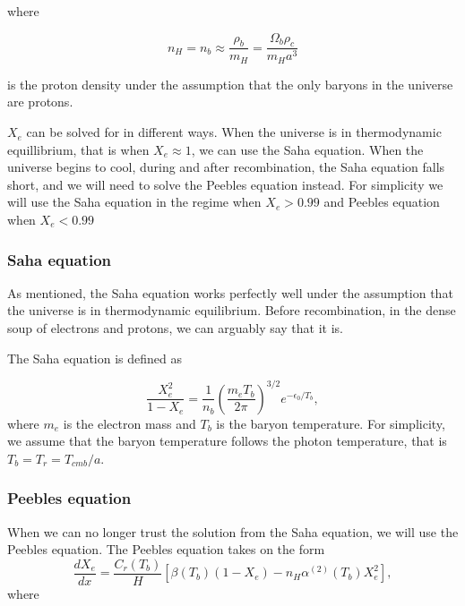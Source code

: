 \documentclass[12pt]{article}
\begin{document}
where 

\begin{equation}\label{eq: proton density}
    n_{H}=n_{b} \approx \frac{\rho_{b}}{m_{H}}=\frac{\Omega_{b} \rho_{c}}{m_{H} a^{3}}
\end{equation}

is the proton density under the assumption that the only baryons in the universe are protons. 

$X_e$ can be solved for in different ways. When the universe is in thermodynamic equillibrium, that is when $X_e \approx 1$, we can use the Saha equation. When the universe begins to cool, during and after recombination, the Saha equation falls short, and we will need to solve the Peebles equation instead. For simplicity we will use the Saha equation in the regime when $X_e > 0.99$ and Peebles equation when $X_e < 0.99$

\subsubsection{Saha equation}
As mentioned, the Saha equation works perfectly well under the assumption that the universe is in thermodynamic equilibrium. Before recombination, in the dense soup of electrons and protons, we can arguably say that it is. 

The Saha equation is defined as 

\begin{equation}\label{eq: saha equation}
    \frac{X_{e}^{2}}{1-X_{e}}=\frac{1}{n_{b}}\left(\frac{m_{e} T_{b}}{2 \pi}\right)^{3 / 2} e^{-\epsilon_{0} / T_{b}},
\end{equation}
where $m_e$ is the electron mass and $T_b$ is the baryon temperature. For simplicity, we assume that the baryon temperature follows the photon temperature, that is $T_b = T_r = T_{cmb}/a$. 

\subsubsection{Peebles equation}
When we can no longer trust the solution from the Saha equation, we will use the Peebles equation. The Peebles equation takes on the form 
\begin{equation}\label{eq: peebles equation}
    \frac{d X_{e}}{d x}=\frac{C_{r}\left(T_{b}\right)}{H}\left[\beta\left(T_{b}\right)\left(1-X_{e}\right)-n_{H} \alpha^{(2)}\left(T_{b}\right) X_{e}^{2}\right],
\end{equation}
where
\end{document}
